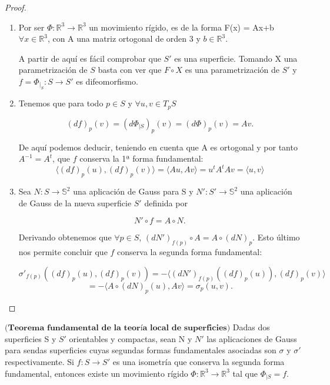 \begin{proof}
	${ }$%
	\begin{enumerate}
		\item Por ser $ \Phi : \mathbb{R}^3 \to \mathbb{R}^3 $ un movimiento rígido, es de la forma F(x) = Ax+b $\forall x \in \mathbb{R}^3$, con A una matriz ortogonal de orden 3 y $b \in \mathbb{R}^3$.
		
		A partir de aquí es fácil comprobar que $S'$ es una superficie. Tomando X una parametrización de $S$ basta con ver que $F\circ X$ es una parametrización de $S'$ y $f = \Phi_{\mid_{S}} : S \to S'$ es difeomorfismo.
		
		
		\item Tenemos que para todo $p \in S$ y $\forall u, v \in T_p S$
		
		\[
		(df)_p(v) = (d\Phi_{\mid S})_p(v) = (d\Phi)_p(v) = Av.
		\]
		
		De aquí podemos deducir, teniendo en cuenta que A es ortogonal y por tanto $A^{-1} = A^t$, que $f$ conserva la 1ª forma fundamental:
		\[
		\langle (df)_p(u), (df)_p(v) \rangle = \langle Au, Av \rangle = u^tA^tAv = \langle u, v \rangle
		\]
		
		\item Sea $N : S \to \mathbb{S}^2$ una aplicación de Gauss para S y $N' : S' \to \mathbb{S}^2$ una aplicación de Gauss de la nueva superficie $S'$ definida por
		
		\[
		N'\circ f = A\circ N.
		\]
		
		Derivando obtenemos que $\forall p \in S$,  $(dN')_{f(p)}\circ A = A \circ (dN)_p$. Esto último nos permite concluir que $f$ conserva la segunda forma fundamental:
		
		\[
		\sigma'_{f(p)}((df)_p(u), (df)_p(v)) = - \langle (dN')_{f(p)}((df)_p(u)), (df)_p(v) \rangle
		\]
		\[
		= - \langle A\circ(dN)_p(u), Av \rangle = \sigma_p(u, v).
		\]
	\end{enumerate}
\end{proof}

\begin{teorema} \label{teo:rig2}
	$\textbf{(Teorema fundamental de la teoría local de superficies)}$ Dadas dos superficies S y $S'$ orientables y compactas, sean N y $N'$ las aplicaciones de Gauss para sendas superficies cuyas segundas formas fundamentales asociadas son $\sigma$ y $\sigma'$ respectivamente.
	Si $f : S \to S'$ es una isometría que conserva la segunda forma fundamental, entonces existe un movimiento rígido $\Phi : \mathbb{R}^3 \to \mathbb{R}^3$ tal que $\Phi_{\mid S} = f$.
\end{teorema}

